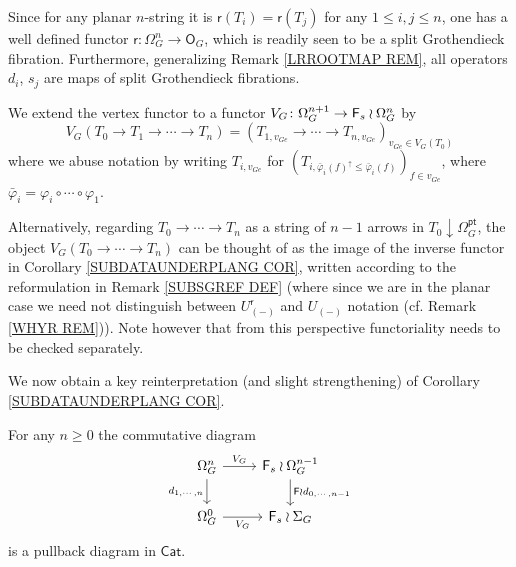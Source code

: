 \documentclass[a4paper,10pt]{article}%
\begin{document}
\begin{remark}\label{ALLSPLITMAPS REM}
Since for any planar $n$-string it is 
$\mathsf{r}(T_i) = \mathsf{r}(T_j)$
for any $1 \leq i,j \leq n$, 
one has a well defined functor
$\mathsf{r} \colon \Omega_{G}^{n} \to \mathsf{O}_G$,
which is readily seen to be a split Grothendieck fibration.
Furthermore, generalizing Remark \ref{LRROOTMAP REM},
all operators $d_i$, $s_j$ 
are maps of split Grothendieck fibrations.
\end{remark}


\begin{notation}\label{VGDEF NOT}
We extend the vertex functor to a functor 
$V_G \colon \Omega_{G}^{n+1} \to \mathsf{F}_s \wr \Omega_{G}^{n}$
by
\begin{equation}\label{VGDEF EQ}
	V_G(T_0 \to T_1 \to \cdots \to T_n) = 
	(T_{1,v_{Ge}} \to \cdots \to
	T_{n,v_{Ge}})_{v_{Ge} \in V_G(T_0)}	
\end{equation}
where we abuse notation by writing $T_{i,v_{Ge}}$
for 
$(T_{i,\bar{\varphi}_i(f)^{\uparrow}\leq \bar{\varphi}_i(f)})_{f \in v_{Ge}}$, where 
$\bar{\varphi}_i = \varphi_i \circ \cdots \circ \varphi_1$.

Alternatively, regarding $T_0 \to \cdots \to T_n$ as a string of $n-1$ arrows in $T_0 \downarrow \Omega_G^{\mathsf{pt}}$, 
the object $V_G(T_0 \to \cdots \to T_n)$
can be thought of as the image of the inverse functor in
Corollary \ref{SUBDATAUNDERPLANG COR},
written according to the reformulation in 
Remark \ref{SUBSGREF DEF}
(where since we are in the planar case we need not distinguish between 
$U_{(\minus)}^{\mathsf{r}}$ and $U_{(\minus)}$ notation
(cf. Remark \ref{WHYR REM})).
Note however that from this perspective
functoriality needs to be checked separately.
\end{notation}

We now obtain a key reinterpretation (and slight strengthening) of Corollary \ref{SUBDATAUNDERPLANG COR}.


\begin{proposition} \label{SUBSASPULL PROP}
For any $n\geq 0$ the commutative diagram
	\begin{equation}\label{PTPULL EQ}
	\begin{tikzcd}
		\Omega_{G}^{n} \ar{r}{V_G} 
		\ar{d}[swap]{d_{1,\cdots,n}} & \Fin_s \wr \Omega_{G}^{n-1} 
		\ar{d}{\Fin \wr d_{0,\cdots,n-1}}
	\\
		\Omega_{G}^{0} \ar{r}[swap]{V_G} & \Fin_s \wr \Sigma_G
	\end{tikzcd}
	\end{equation}
is a pullback diagram in $\mathsf{Cat}$.
\end{proposition}
\end{document}
